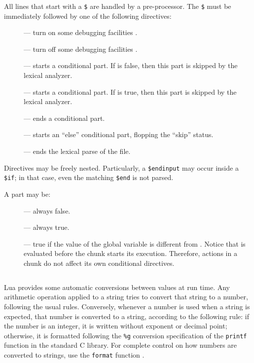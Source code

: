 All lines that start with a \verb|$| are handled by a pre-processor.
The \verb|$| must be immediately followed by one of the following directives:
\begin{description}
\item[] --- turn on some debugging facilities .
\item[] --- turn off some debugging facilities .
\item[] --- starts a conditional part.
If  is false, then this part is skipped by the lexical analyzer.
\item[] --- starts a conditional part.
If  is true, then this part is skipped by the lexical analyzer.
\item[] --- ends a conditional part.
\item[] --- starts an ``else'' conditional part,
flopping the ``skip'' status.
\item[] --- ends the lexical parse of the file.
\end{description}

Directives may be freely nested.
Particularly, a \verb|$endinput| may occur inside a \verb|$if|;
in that case, even the matching \verb|$end| is not parsed.

A  part may be:
\begin{description}
\item[] --- always false.
\item[] --- always true.
\item[] --- true if the value of the
global variable  is different from \nil.
Notice that  is evaluated before the chunk starts its execution.
Therefore, actions in a chunk do not affect its own conditional directives.
\end{description}

\subsection{} \label{coercion}

Lua provides some automatic conversions between values at run time.
Any arithmetic operation applied to a string tries to convert
that string to a number, following the usual rules.
Conversely, whenever a number is used when a string is expected,
that number is converted to a string, according to the following rule:
if the number is an integer, it is written without exponent or decimal point;
otherwise, it is formatted following the \verb|%g|
conversion specification of the \verb|printf| function in the
standard C library.
For complete control on how numbers are converted to strings,
use the \verb|format| function .


